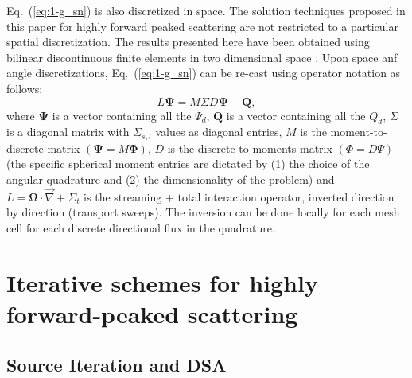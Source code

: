 \documentclass[preprint,10pt]{elsarticle}
\newcommand\bo{\boldsymbol{\Omega}}
\newcommand\bs{\boldsymbol}
\renewcommand{\(}{\left(}
\renewcommand{\)}{\right)}
\renewcommand{\[}{\left[}
\renewcommand{\]}{\right]}
\newcommand{\grad}{\vec{\nabla}}
\newcommand{\eqt}[1]{Eq.~(\ref{#1})}                     %
\begin{document}
\eqt{eq:1-g_sn} is also discretized in space. The solution techniques proposed
in this paper for highly forward peaked scattering are not restricted to a 
particular spatial discretization. The results presented here have been obtained 
using bilinear discontinuous finite elements in two dimensional space \cite{dgfem}.
Upon space anf angle discretizations, \eqt{eq:1-g_sn} can be re-cast using operator notation as follows:
%
\begin{equation}
L \bs{\Psi} = M\Sigma D \bs{\Psi} + \bs{Q},
\label{eq:operator}
\end{equation}
%
where $\bs{\Psi}$ is a vector containing all the $\Psi_d$, $\bs{Q}$ is a
vector containing all the $Q_d$, $\Sigma$ is a diagonal matrix with 
$\Sigma_{s,l}$ values as diagonal entries, $M$ is the moment-to-discrete
matrix $(\bs{\Psi} = M\bs{\Phi})$, $D$ is the discrete-to-moments matrix
$(\Phi=D\Psi)$ (the specific spherical moment entries are dictated by (1) the choice of 
the angular quadrature and (2) the dimensionality of the problem) and 
$L = \bo\cdot\grad + \Sigma_t$ is the streaming + total interaction operator,
inverted direction by direction (transport sweeps). The inversion can be done
locally for each mesh cell for each discrete directional flux in the
quadrature.\\

\section{Iterative schemes for highly forward-peaked scattering} \label{sec:iterative_scheme}

\subsection{Source Iteration and DSA}
\end{document}
